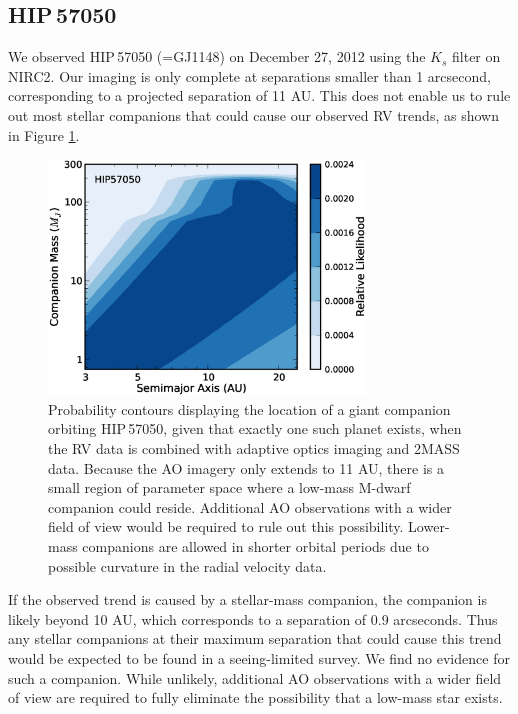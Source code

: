 \subsection{HIP\,57050}
\label{HIP57050}
We observed HIP\,57050 (=GJ1148) on December 27, 2012 using the $K_s$ filter on NIRC2. Our imaging is only complete at separations smaller than 1 arcsecond, corresponding to a projected separation of 11 AU. This does not enable us to rule out most stellar companions that could cause our observed RV trends, as shown in Figure \ref{Wright57050}.
\begin{figure}[htbp]
\centerline{\includegraphics[width=0.75\textwidth]{chapter3/f17.eps}}
\caption[Probability contours displaying the location of a giant companion orbiting HIP\,57050, given that exactly one such planet exists]{Probability contours displaying the location of a giant companion orbiting HIP\,57050, given that exactly one such planet exists, when the RV data is combined with adaptive optics imaging and 2MASS data. Because the AO imagery only extends to 11 AU, there is a small region of parameter space where a low-mass M-dwarf companion could reside. Additional AO observations with a wider field of view would be required to rule out this possibility. Lower-mass companions are allowed in shorter orbital periods due to possible curvature in the radial velocity data.
}
\label{Wright57050}
\end{figure}
If the observed trend is caused by a stellar-mass companion, the companion is likely beyond 10 AU, which corresponds to a separation of 0.9 arcseconds. Thus any stellar companions at their maximum separation that could cause this trend would be expected to be found in a seeing-limited survey. We find no evidence for such a companion. While unlikely, additional AO observations with a wider field of view are required to fully eliminate the possibility that a low-mass star exists. 


